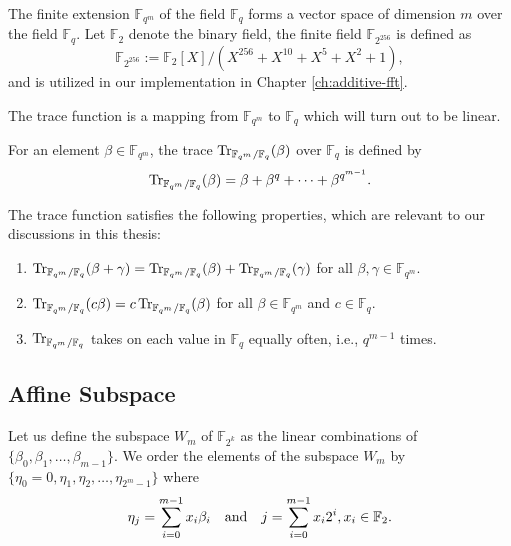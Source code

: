The finite extension $\mathbb{F}_{q^m}$ of the field $\mathbb{F}_{q}$ forms a vector space of dimension $m$ over the field $\mathbb{F}_{q}$. Let $\mathbb{F}_2$ denote the binary field, the  finite field $\mathbb{F}_{2^{256}}$ is defined as
\begin{equation}\label{eq:F_2_256}
	\mathbb{F}_{2^{256}} := \mathbb{F}_{2}[X]/(X^{256} + X^{10} + X^5 + X^2 + 1),
\end{equation}
and is utilized in our implementation in Chapter \ref{ch:additive-fft}.

The trace function is a mapping from $\mathbb{F}_{q^m}$ to $\mathbb{F}_{q}$ which will turn out to be linear.

\begin{definition}
	For an element $\beta \in \mathbb{F}_{q^m}$, the trace $\operatorname{Tr}_{\mathbb{F}_{q^m}/\mathbb{F}_{q}}(\beta)$ over $\mathbb{F}_{q}$ is defined by
	\[
	\operatorname{Tr}_{\mathbb{F}_{q^m}/\mathbb{F}_{q}}(\beta) = \beta + \beta^q + \cdots + \beta^{q^{m-1}}.
	\]
\end{definition}

The trace function satisfies the following properties, which are relevant to our discussions in this thesis:

\begin{enumerate}[label=(\roman*)]
	\item $\operatorname{Tr}_{\mathbb{F}_{q^m}/\mathbb{F}_{q}}(\beta+\gamma)= \operatorname{Tr}_{\mathbb{F}_{q^m}/\mathbb{F}_{q}}(\beta)+\operatorname{Tr}_{\mathbb{F}_{q^m}/\mathbb{F}_{q}}(\gamma)$ for all $\beta,\gamma \in \mathbb{F}_{q^m}$.
	
	\item $\operatorname{Tr}_{\mathbb{F}_{q^m}/\mathbb{F}_{q}}(c\beta)= c\operatorname{Tr}_{\mathbb{F}_{q^m}/\mathbb{F}_{q}}(\beta)$ for all $\beta \in \mathbb{F}_{q^m}$ and $c \in \mathbb{F}_{q}$.
	
	\item $\operatorname{Tr}_{\mathbb{F}_{q^m}/\mathbb{F}_{q}}$ takes on each value in $\mathbb{F}_{q}$ equally often, i.e., $q^{m-1}$ times.\label{Trace-Property3}
\end{enumerate}



	
\subsection{Affine Subspace} \label{sec:prel_affine_sub_space}
Let us define the subspace $W_m$ of $\mathbb{F}_{2^k}$ as the linear combinations of $\{\beta_0, \beta_1, \ldots, \beta_{m-1}\}$. We order the elements of the subspace $W_m$ by $\{\eta_0=0, \eta_1, \eta_2, \dots, \eta_{2^m-1}\}$ where
\[
\eta_j = \sum_{i=0}^{m-1} x_i \beta_i \quad \text{and} \quad j=\sum_{i=0}^{m-1} x_i 2^i, x_i\in {\mathbb F}_2.
\]

